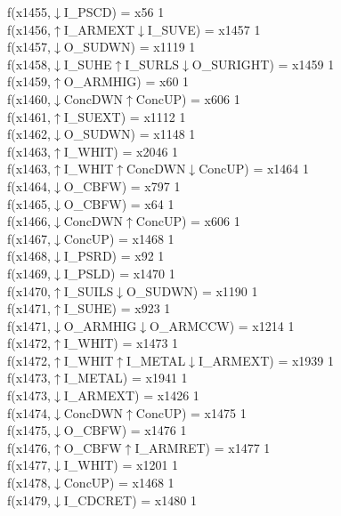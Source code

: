 f(x1455,$\downarrow$I\_PSCD) = x56 {1} \\
f(x1456,$\uparrow$I\_ARMEXT$\downarrow$I\_SUVE) = x1457 {1} \\
f(x1457,$\downarrow$O\_SUDWN) = x1119 {1} \\
f(x1458,$\downarrow$I\_SUHE$\uparrow$I\_SURLS$\downarrow$O\_SURIGHT) = x1459 {1} \\
f(x1459,$\uparrow$O\_ARMHIG) = x60 {1} \\
f(x1460,$\downarrow$ConcDWN$\uparrow$ConcUP) = x606 {1} \\
f(x1461,$\uparrow$I\_SUEXT) = x1112 {1} \\
f(x1462,$\downarrow$O\_SUDWN) = x1148 {1} \\
f(x1463,$\uparrow$I\_WHIT) = x2046 {1} \\
f(x1463,$\uparrow$I\_WHIT$\uparrow$ConcDWN$\downarrow$ConcUP) = x1464 {1} \\
f(x1464,$\downarrow$O\_CBFW) = x797 {1} \\
f(x1465,$\downarrow$O\_CBFW) = x64 {1} \\
f(x1466,$\downarrow$ConcDWN$\uparrow$ConcUP) = x606 {1} \\
f(x1467,$\downarrow$ConcUP) = x1468 {1} \\
f(x1468,$\downarrow$I\_PSRD) = x92 {1} \\
f(x1469,$\downarrow$I\_PSLD) = x1470 {1} \\
f(x1470,$\uparrow$I\_SUILS$\downarrow$O\_SUDWN) = x1190 {1} \\
f(x1471,$\uparrow$I\_SUHE) = x923 {1} \\
f(x1471,$\downarrow$O\_ARMHIG$\downarrow$O\_ARMCCW) = x1214 {1} \\
f(x1472,$\uparrow$I\_WHIT) = x1473 {1} \\
f(x1472,$\uparrow$I\_WHIT$\uparrow$I\_METAL$\downarrow$I\_ARMEXT) = x1939 {1} \\
f(x1473,$\uparrow$I\_METAL) = x1941 {1} \\
f(x1473,$\downarrow$I\_ARMEXT) = x1426 {1} \\
f(x1474,$\downarrow$ConcDWN$\uparrow$ConcUP) = x1475 {1} \\
f(x1475,$\downarrow$O\_CBFW) = x1476 {1} \\
f(x1476,$\uparrow$O\_CBFW$\uparrow$I\_ARMRET) = x1477 {1} \\
f(x1477,$\downarrow$I\_WHIT) = x1201 {1} \\
f(x1478,$\downarrow$ConcUP) = x1468 {1} \\
f(x1479,$\downarrow$I\_CDCRET) = x1480 {1} \\
